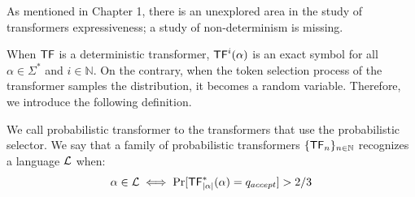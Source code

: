 

As mentioned in Chapter 1, there is an unexplored area in the study of transformers expressiveness; a study of non-determinism is missing.

When $\mathsf{TF}$ is a deterministic transformer, $\mathsf{TF}^i(\alpha)$ is an exact symbol for all $\alpha \in \Sigma^*$ and $i \in \mathbb{N}$.
On the contrary, when the token selection process of the transformer samples the distribution, it becomes a random variable.
Therefore, we introduce the following definition.


\begin{definition}
    We call probabilistic transformer to the transformers that use the probabilistic selector.
    We say that a family of probabilistic transformers $\{\mathsf{TF}_n\}_{n \in \mathbb{N}}$ recognizes a language $\mathcal{L}$ when: 
    \[
    \alpha \in \mathcal{L} \iff \Pr[\mathsf{TF}_{|\alpha|}^*(\alpha) = q_{accept}] > 2/3
    \]
\end{definition}

